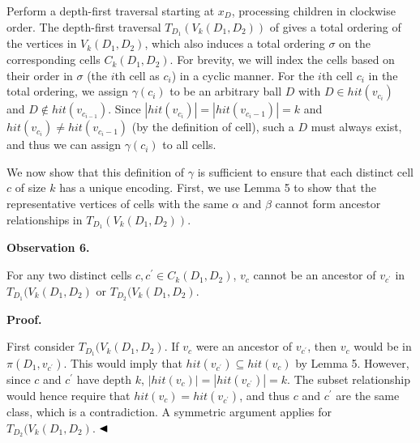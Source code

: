 \par
\par
Perform a depth-first traversal starting at $x_{D}$, processing children in clockwise order. The depth-first traversal $T_{D_{1}}(V_{k}(D_{1},D_{2}))$ of gives a total ordering of the vertices in $V_{k}(D_{1},D_{2})$, which also induces a total ordering $\sigma$ on the corresponding cells $C_{k}(D_{1},D_{2})$. For brevity, we will index the cells based on their order in $\sigma$ (the $i$th cell as $c_{i}$) in a cyclic manner. For the $i$th cell $c_{i}$ in the total ordering, we assign $\gamma(c_{i})$ to be an arbitrary ball $D$ with $D\in\mathit{hit}(v_{c_{i}})$ and $D\not\in\mathit{hit}(v_{c_{i-1}})$. Since $|\mathit{hit}(v_{c_{i}})|=|\mathit{hit}(v_{c_{i}-1})|=k$ and $\mathit{hit}(v_{c_{i}})\neq\mathit{hit}(v_{c_{i}-1})$ (by the definition of cell), such a $D$ must always exist, and thus we can assign $\gamma(c_{i})$ to all cells.
\par
\par
We now show that this definition of $\gamma$ is sufficient to ensure that each distinct cell $c$ of size $k$ has a unique encoding. First, we use Lemma 5 to show that the representative vertices of cells with the same $\alpha$ and $\beta$ cannot form ancestor relationships in $T_{D_{1}}(V_{k}(D_{1},D_{2}))$.
\par
\par
\par\medskip\noindent\textbf{Observation 6.}\par
For any two distinct cells $c,c^{\prime}\in C_{k}(D_{1},D_{2})$, $v_{c}$ cannot be an ancestor of $v_{c^{\prime}}$ in $T_{D_{1}}(V_{k}(D_{1},D_{2})$ or $T_{D_{2}}(V_{k}(D_{1},D_{2})$.
\par
\par
\par
\par\medskip\noindent\textbf{Proof.}\par
First consider $T_{D_{1}}(V_{k}(D_{1},D_{2})$. If $v_{c}$ were an ancestor of $v_{c^{\prime}}$, then $v_{c}$ would be in $\pi(D_{1},v_{c^{\prime}})$. This would imply that $\mathit{hit}(v_{c^{\prime}})\subseteq\mathit{hit}(v_{c})$ by Lemma 5. However, since $c$ and $c^{\prime}$ have depth $k$, $|\mathit{hit}(v_{c})|=|\mathit{hit}(v_{c^{\prime}})|=k$. The subset relationship would hence require that $\mathit{hit}(v_{c})=\mathit{hit}(v_{c^{\prime}})$, and thus $c$ and $c^{\prime}$ are the same class, which is a contradiction. A symmetric argument applies for $T_{D_{2}}(V_{k}(D_{1},D_{2})$. $\hfill\blacktriangleleft$

